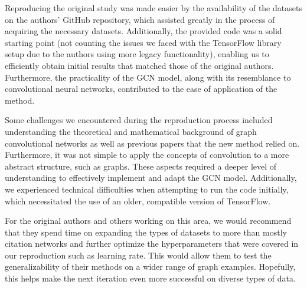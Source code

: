 \documentclass[11pt,a4paper]{article}
\begin{document}
Reproducing the original study was made easier by the availability of the datasets on the authors' GitHub repository, which assisted greatly in the process of acquiring the necessary datasets. Additionally, the provided code was a solid starting point (not counting the issues we faced with the TensorFlow library setup due to the authors using more legacy functionality), enabling us to efficiently obtain initial results that matched those of the original authors. Furthermore, the practicality of the GCN model, along with its resemblance to convolutional neural networks, contributed to the ease of application of the method.

Some challenges we encountered during the reproduction process included understanding the theoretical and mathematical background of graph convolutional networks as well as previous papers that the new method relied on. Furthermore, it was not simple to apply the concepts of convolution to a more abstract structure, such as graphs. These aspects required a deeper level of understanding to effectively implement and adapt the GCN model. Additionally, we experienced technical difficulties when attempting to run the code initially, which necessitated the use of an older, compatible version of TensorFlow.

For the original authors and others working on this area, we would recommend that they spend time on expanding the types of datasets to more than mostly citation networks and further optimize the hyperparameters that were covered in our reproduction such as learning rate. This would allow them to test the generalizability of their methods on a wider range of graph examples. Hopefully, this helps make the next iteration even more successful on diverse types of data.




\end{document}
